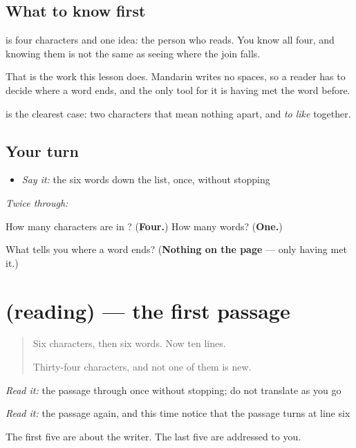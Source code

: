 \subsection*{What to know first}
\textbf{} is four characters and one idea: the person who reads. You know all four, and knowing them is not the same as seeing where the join falls.

That is the work this lesson does. Mandarin writes no spaces, so a reader has to decide where a word ends, and the only tool for it is having met the word before.

\textbf{} is the clearest case: two characters that mean nothing apart, and \emph{to like} together.

\subsection*{Your turn}
\begin{itemize}
\raggedright
  \item \emph{Say it:} the six words down the list, once, without stopping
\end{itemize}

\emph{Twice through:}

\begin{tcolorbox}[breakable,colback=teal!4,colframe=teal!35!black,title={Before you move on}]
How many characters are in ? (\textbf{Four.}) How many words? (\textbf{One.})

What tells you where a word ends? (\textbf{Nothing on the page} — only having met it.)
\end{tcolorbox}
\section[(reading)]{(reading) — the first passage}

\label{lesson:ZH-C29-diyi-ke}



\begin{quote}
Six characters, then six words. Now ten lines.

Thirty-four characters, and not one of them is new.
\end{quote}

\begin{tcolorbox}[breakable,skin=enhanced,colback=orange!6,colframe=orange!45!black,boxrule=0.5pt,arc=1mm,left=6pt,right=6pt,top=4pt,bottom=4pt,fonttitle=\bfseries,title={Read this}]
\begin{quote}
         
\end{quote}

\emph{Read it:} the passage through once without stopping; do not translate as you go

\emph{Read it:} the passage again, and this time notice that the passage turns at line six

The first five are about the writer. The last five are addressed to you.
\end{tcolorbox}

